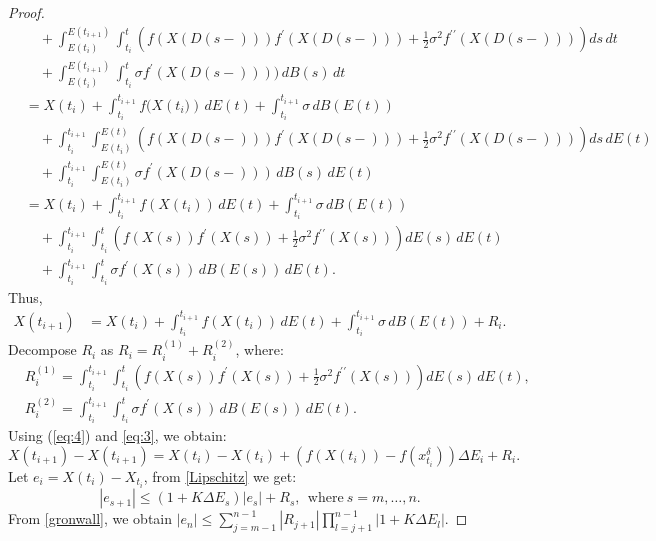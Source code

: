 \documentclass[10pt,reqno,final]{amsart}
\theoremstyle{plain}
\theoremstyle{definition}
\theoremstyle{remark}
\numberwithin{equation}{section}
\numberwithin{figure}{section}
\numberwithin{table}{section}
\begin{document}
\begin{proof}
\begin{align*}
		&\quad + \int_{E(t_i)}^{E(t_{i+1})} \int_{t_i}^{t}\left( f(X(D(s-))) f^{\prime}(X(D(s-))) + \frac{1}{2} \sigma^2 f^{\prime\prime}(X(D(s-))) \right) ds \, dt \\
		&\quad + \int_{E(t_i)}^{E(t_{i+1})} \int_{t_i}^{t}\sigma f^{\prime}(X(D(s-)))) \, dB(s) \, dt \\
		&= X(t_i) + \int_{t_i}^{t_{i+1}} f(X({t_i)}) \, dE(t) + \int_{t_i}^{t_{i+1}} \sigma \, dB(E(t)) \\
		&\quad + \int_{t_i}^{t_{i+1}} \int_{E(t_i)}^{E(t)} \left( f(X(D(s-))) f^{\prime}(X(D(s-))) + \frac{1}{2} \sigma^2 f^{\prime\prime}(X(D(s-))) \right) ds \, dE(t) \\
		&\quad + \int_{t_i}^{t_{i+1}} \int_{E(t_i)}^{E(t)}\sigma f^{\prime}(X(D(s-))) \, dB(s) \, dE(t)\\
		&= X(t_i) + \int_{t_i}^{t_{i+1}} f(X({t_i})) \, dE(t) + \int_{t_i}^{t_{i+1}} \sigma \, dB(E(t)) \\
		&\quad + \int_{t_i}^{t_{i+1}} \int_{t_i}^{t} \left( f(X(s)) f^{\prime}(X(s)) + \frac{1}{2} \sigma^2 f^{\prime\prime}(X(s)) \right) dE(s) \, dE(t) \\
		&\quad + \int_{t_i}^{t_{i+1}} \int_{t_i}^{t}\sigma f^{\prime}(X(s)) \, dB(E(s)) \, dE(t). 
	\end{align*}
	Thus,
	\begin{align}\label{eq:3}
		X(t_{i+1})
		&= X(t_i) + \int_{t_i}^{t_{i+1}} f(X(t_i)) \, dE(t) + \int_{t_i}^{t_{i+1}} \sigma \, dB(E(t)) + R_i. 
	\end{align}
	Decompose \( R_i \) as \( R_i = R_i^{(1)} + R_i^{(2)} \), where:
	\begin{align*}
		& R_i^{(1)} = \int_{t_i}^{t_{i+1}} \int_{t_i}^{t} \left( f(X(s)) f^{\prime}(X(s)) + \frac{1}{2} \sigma^2 f^{\prime\prime}(X(s)) \right) dE(s) \, dE(t), \\
		& R_i^{(2)} = \int_{t_i}^{t_{i+1}} \int_{t_i}^{t} \sigma f^{\prime}(X(s)) \, dB(E(s)) \, dE(t). 
	\end{align*}
	Using (\ref{eq:4}) and \eqref{eq:3}, we obtain:
	\begin{equation}
		X(t_{i+1}) - X(t_{i+1}) = X(t_i) - X(t_i) + (f(X(t_i)) - f(x^\delta_{t_i})) \Delta E_i + R_i.
	\end{equation}
	Let \( e_i = X(t_i) - X_{t_i} \), from \cref{Lipschitz} we get:
	\begin{equation}
		|e_{s+1}| \leq (1 + K \Delta E_s) |e_s| + R_s, ~~ \text{where}~ s = m, \dots, n.
	\end{equation}
	From \cref{gronwall}, we obtain \( |e_n| \leq \sum\limits_{j=m-1}^{n-1} |R_{j+1}| \prod\limits_{l=j+1}^{n-1} |1 + K \Delta E_l| \).
	

\end{proof}
\end{document}
